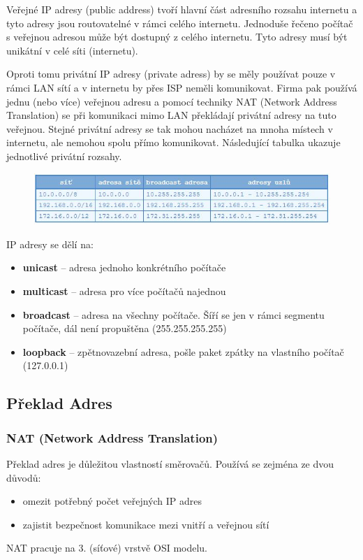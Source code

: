 Veřejné IP adresy (public address) tvoří hlavní část adresního rozsahu internetu a tyto adresy jsou routovatelné v rámci celého internetu. Jednoduše řečeno počítač s veřejnou adresou může být dostupný z celého internetu. Tyto adresy musí být unikátní v celé síti (internetu).

Oproti tomu privátní IP adresy (private adress) by se měly používat pouze v rámci LAN sítí a v internetu by přes ISP neměli komunikovat. Firma pak používá jednu (nebo více) veřejnou adresu a pomocí techniky NAT (Network Address Translation) se při komunikaci mimo LAN překládají privátní adresy na tuto veřejnou. Stejné privátní adresy se tak mohou nacházet na mnoha místech v internetu, ale nemohou spolu přímo komunikovat. Následující tabulka ukazuje jednotlivé privátní rozsahy.
\begin{figure}[H]
\centering
\includegraphics[width=1\textwidth]{assets/6_ip4}
\end{figure}

IP adresy se dělí na:
\begin{itemize}
\item \textbf{unicast} -- adresa jednoho konkrétního počítače
\item \textbf{multicast} -- adresa pro více počítačů najednou
\item \textbf{broadcast} -- adresa na všechny počítače. Šíří se jen v rámci segmentu počítače, dál není propuštěna (255.255.255.255)
\item \textbf{loopback} -- zpětnovazební adresa, pošle paket zpátky na vlastního počítač (127.0.0.1)
\end{itemize}

\subsection{Překlad Adres}
\subsubsection{NAT (Network Address Translation)}
Překlad adres je důležitou vlastností směrovačů. Používá se zejména ze dvou důvodů:
\begin{itemize}
	\item omezit potřebný počet veřejných IP adres
	\item zajistit bezpečnost komunikace mezi vnitří a veřejnou sítí
\end{itemize}
NAT pracuje na 3. (síťové) vrstvě OSI modelu. 

